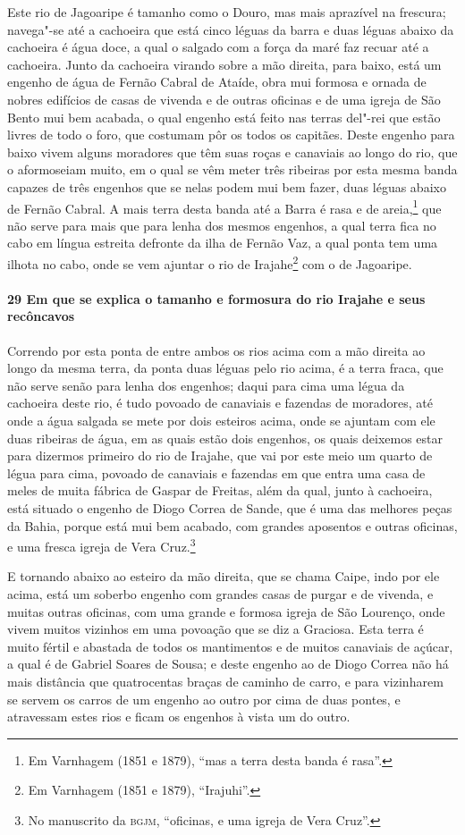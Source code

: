 \begin{linenumbers}
Este rio de Jagoaripe é tamanho como o Douro, mas mais aprazível na frescura; navega"-se
até a cachoeira que está cinco léguas da barra e duas léguas abaixo da cachoeira é água
doce, a qual o salgado com a força da maré faz recuar até a cachoeira. Junto da cachoeira
virando sobre a mão direita, para baixo, está um engenho de água de Fernão Cabral de
Ataíde, obra mui formosa e ornada de nobres edifícios de casas de vivenda e de outras
oficinas e de uma igreja de São Bento mui bem acabada, o qual engenho está feito nas
terras del"-rei que estão livres de todo o foro, que costumam pôr os todos os capitães.
Deste engenho para baixo vivem alguns
moradores que têm suas roças e canaviais ao longo do rio, que o aformoseiam muito, em o
qual se vêm meter três ribeiras por esta mesma banda capazes de três engenhos que se nelas
podem mui bem fazer, duas léguas abaixo de Fernão Cabral. A mais terra desta banda até a
Barra é rasa e de areia,\footnote{ Em Varnhagem (1851 e 1879), ``mas a terra desta banda é
rasa''.} que não serve para mais que para lenha dos mesmos engenhos, a qual terra fica no
cabo em língua estreita defronte da ilha de Fernão Vaz, a qual ponta tem uma ilhota no
cabo, onde se vem ajuntar o rio de Irajahe\footnote{ Em Varnhagem (1851 e 1879),
``Irajuhi''.} com o de Jagoaripe.

\paragraph{29 Em que se explica o tamanho e formosura do rio Irajahe e seus recôncavos}\quad
Correndo por esta ponta de entre ambos os rios acima com a mão direita ao longo da mesma
terra, da ponta duas léguas pelo rio acima, é a terra fraca, que não serve senão para
lenha dos engenhos; daqui para cima uma légua da cachoeira deste rio, é tudo povoado de
canaviais e fazendas de moradores, até onde a água salgada se mete por dois esteiros
acima, onde se ajuntam com ele duas ribeiras de água, em as quais estão dois engenhos, os
quais deixemos estar para dizermos primeiro do rio de Irajahe, que vai por este meio um
quarto de légua para cima, povoado de canaviais e fazendas em que entra uma casa de meles
de muita fábrica de Gaspar de Freitas, além da qual, junto à cachoeira, está situado o
engenho de Diogo Correa de Sande, que é uma das melhores peças da Bahia, porque está mui
bem acabado, com grandes aposentos e outras oficinas, e uma fresca igreja de Vera
Cruz.\footnote{ No manuscrito da \textsc{bgjm}, ``oficinas, e uma igreja de Vera Cruz''.}

E tornando abaixo ao esteiro da mão direita, que se chama Caipe, indo por ele acima, está
um soberbo engenho com grandes casas de purgar e de vivenda, e muitas outras oficinas, com
uma grande e formosa igreja de São Lourenço, onde vivem muitos vizinhos em uma povoação
que se diz a Graciosa. Esta terra é muito fértil e abastada de todos os mantimentos e de
muitos canaviais de açúcar, a qual é de Gabriel Soares de Sousa; e deste engenho ao de
Diogo Correa não há mais distância que quatrocentas braças de caminho de carro, e para
vizinharem se servem os carros de um engenho ao outro por cima de duas pontes, e
atravessam estes rios e ficam os engenhos à vista um do outro.


\end{linenumbers}
